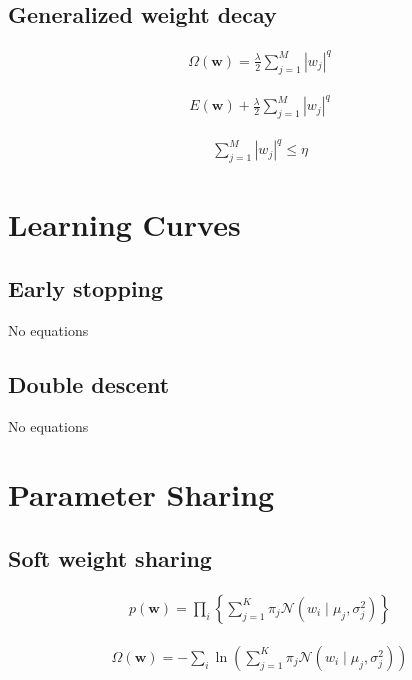 \documentclass{article}
\begin{document}
\subsection{Generalized weight decay}

\begin{align*}
\Omega(\mathbf{w})=\frac{\lambda}{2} \sum_{j=1}^{M}\left|w_{j}\right|^{q}
\tag{9.18}
\end{align*}

\begin{align*}
E(\mathbf{w})+\frac{\lambda}{2} \sum_{j=1}^{M}\left|w_{j}\right|^{q}
\tag{9.19}
\end{align*}

\begin{align*}
\sum_{j=1}^{M}\left|w_{j}\right|^{q} \leqslant \eta
\tag{9.20}
\end{align*}

\section{Learning Curves}

\subsection{Early stopping}
No equations

\subsection{Double descent}
No equations

\section{Parameter Sharing}

\subsection{Soft weight sharing}

\begin{align*}
p(\mathbf{w})=\prod_{i}\left\{\sum_{j=1}^{K} \pi_{j} \mathcal{N}\left(w_{i} \mid \mu_{j}, \sigma_{j}^{2}\right)\right\} 
\tag{9.21}
\end{align*}

\begin{align*}
\Omega(\mathbf{w})=-\sum_{i} \ln \left(\sum_{j=1}^{K} \pi_{j} \mathcal{N}\left(w_{i} \mid \mu_{j}, \sigma_{j}^{2}\right)\right) 
\tag{9.22}
\end{align*}
\end{document}
